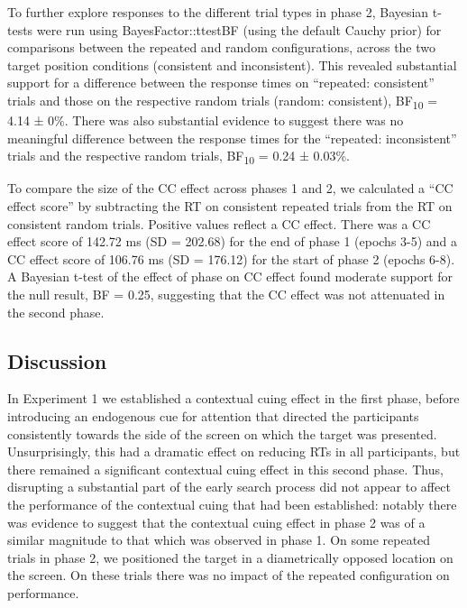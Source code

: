 \documentclass[
  man,
  floatsintext,
  longtable,
  nolmodern,
  notxfonts,
  notimes,
  colorlinks=true,linkcolor=blue,citecolor=blue,urlcolor=blue]{apa7}
\begin{document}
To further explore responses to the different trial types in phase 2,
Bayesian t-tests were run using BayesFactor::ttestBF (using the default
Cauchy prior) for comparisons between the repeated and random
configurations, across the two target position conditions (consistent
and inconsistent). This revealed substantial support for a difference
between the response times on ``repeated: consistent'' trials and those
on the respective random trials (random: consistent),
BF\textsubscript{10} = 4.14 ± 0\%. There was also substantial evidence
to suggest there was no meaningful difference between the response times
for the ``repeated: inconsistent'' trials and the respective random
trials, BF\textsubscript{10} = 0.24 ± 0.03\%.

To compare the size of the CC effect across phases 1 and 2, we
calculated a ``CC effect score'' by subtracting the RT on consistent
repeated trials from the RT on consistent random trials. Positive values
reflect a CC effect. There was a CC effect score of 142.72 ms (SD =
202.68) for the end of phase 1 (epochs 3-5) and a CC effect score of
106.76 ms (SD = 176.12) for the start of phase 2 (epochs 6-8). A
Bayesian t-test of the effect of phase on CC effect found moderate
support for the null result, BF = 0.25, suggesting that the CC effect
was not attenuated in the second phase.

\subsection{Discussion}\label{discussion}

In Experiment 1 we established a contextual cuing effect in the first
phase, before introducing an endogenous cue for attention that directed
the participants consistently towards the side of the screen on which
the target was presented. Unsurprisingly, this had a dramatic effect on
reducing RTs in all participants, but there remained a significant
contextual cuing effect in this second phase. Thus, disrupting a
substantial part of the early search process did not appear to affect
the performance of the contextual cuing that had been established:
notably there was evidence to suggest that the contextual cuing effect
in phase 2 was of a similar magnitude to that which was observed in
phase 1. On some repeated trials in phase 2, we positioned the target in
a diametrically opposed location on the screen. On these trials there
was no impact of the repeated configuration on performance.
\end{document}
